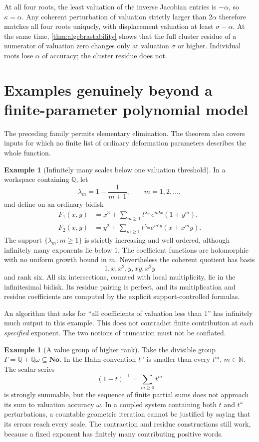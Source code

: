 \documentclass[11pt,letterpaper]{article}
\theoremstyle{definition}
\newtheorem{example}[theorem]{Example}
\theoremstyle{remark}
\newcommand{\No}{\mathbf{No}}
\newcommand{\N}{\mathbb N}
\newcommand{\Q}{\mathbb Q}
\numberwithin{equation}{section}
\begin{document}
At all four roots, the least valuation of the inverse Jacobian entries is $-\alpha$, so $\kappa=\alpha$. Any coherent perturbation of valuation strictly larger than $2\alpha$ therefore matches all four roots uniquely, with displacement valuation at least $\sigma-\alpha$. At the same time, \cref{thm:algebrastability} shows that the full cluster residue of a numerator of valuation zero changes only at valuation $\sigma$ or higher. Individual roots lose $\alpha$ of accuracy; the cluster residue does not.

\section{Examples genuinely beyond a finite-parameter polynomial model}\label{sec:infinite}
The preceding family permits elementary elimination. The theorem also covers inputs for which no finite list of ordinary deformation parameters describes the whole function.

\begin{example}[Infinitely many scales below one valuation threshold]\label{ex:infinitesupport}
In a workspace containing $\Q$, let
\[
 \lambda_m=1-\frac1{m+1},\qquad m=1,2,\ldots,
\]
and define on an ordinary bidisk
\begin{align*}
 F_1(x,y)&=x^3+
      \sum_{m\ge1}t^{\lambda_m}e^{m!x}(1+y^m),\\
 F_2(x,y)&=y^2+
      \sum_{m\ge1}t^{\lambda_m}e^{m!y}(x+x^my).
\end{align*}
The support $\{\lambda_m:m\ge1\}$ is strictly increasing and well ordered, although infinitely many exponents lie below $1$. The coefficient functions are holomorphic with no uniform growth bound in $m$. Nevertheless the coherent quotient has basis
\[
 1,x,x^2,y,xy,x^2y
\]
and rank six. All six intersections, counted with local multiplicity, lie in the infinitesimal bidisk. Its residue pairing is perfect, and its multiplication and residue coefficients are computed by the explicit support-controlled formulas.
\end{example}

An algorithm that asks for ``all coefficients of valuation less than $1$'' has infinitely much output in this example. This does not contradict finite contribution at each \emph{specified} exponent. The two notions of truncation must not be conflated.

\begin{example}[A value group of higher rank]
Take the divisible group $\Gamma=\Q+\Q\omega\subseteq\No$. In the Hahn convention $t^\omega$ is smaller than every $t^m$, $m\in\N$. The scalar series
\[
 (1-t)^{-1}=\sum_{m\ge0}t^m
\]
is strongly summable, but the sequence of finite partial sums does not approach its sum to valuation accuracy $\omega$. In a coupled system containing both $t$ and $t^\omega$ perturbations, a countable geometric iteration cannot be justified by saying that its errors reach every scale. The contraction and residue constructions still work, because a fixed exponent has finitely many contributing positive words.
\end{example}
\end{document}
